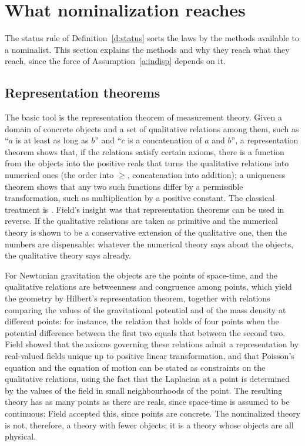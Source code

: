 \documentclass{situationist-preprint}
\begin{document}
\section{What nominalization reaches}\label{s:nom}

The status rule of Definition~\ref{d:status} sorts the laws by the methods available to a nominalist. This section explains the methods and why they reach what they reach, since the force of Assumption~\ref{a:indisp} depends on it.

\subsection{Representation theorems}

The basic tool is the representation theorem of measurement theory. Given a domain of concrete objects and a set of qualitative relations among them, such as \enquote{$a$ is at least as long as $b$} and \enquote{$c$ is a concatenation of $a$ and $b$}, a representation theorem shows that, if the relations satisfy certain axioms, there is a function from the objects into the positive reals that turns the qualitative relations into numerical ones (the order into $\geq$, concatenation into addition); a uniqueness theorem shows that any two such functions differ by a permissible transformation, such as multiplication by a positive constant. The classical treatment is \citet{KrantzEtAl1971}. Field's insight was that representation theorems can be used in reverse. If the qualitative relations are taken as primitive and the numerical theory is shown to be a conservative extension of the qualitative one, then the numbers are dispensable: whatever the numerical theory says about the objects, the qualitative theory says already.

For Newtonian gravitation the objects are the points of space-time, and the qualitative relations are betweenness and congruence among points, which yield the geometry by Hilbert's representation theorem, together with relations comparing the values of the gravitational potential and of the mass density at different points: for instance, the relation that holds of four points when the potential difference between the first two equals that between the second two. Field showed that the axioms governing these relations admit a representation by real-valued fields unique up to positive linear transformation, and that Poisson's equation and the equation of motion can be stated as constraints on the qualitative relations, using the fact that the Laplacian at a point is determined by the values of the field in small neighbourhoods of the point. The resulting theory has as many points as there are reals, since space-time is assumed to be continuous; Field accepted this, since points are concrete. The nominalized theory is not, therefore, a theory with fewer objects; it is a theory whose objects are all physical.
\end{document}
